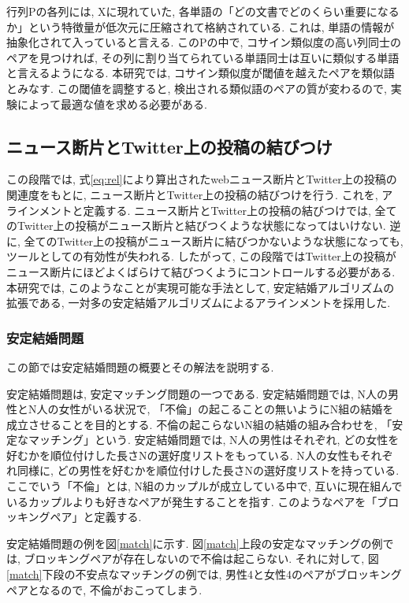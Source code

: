 \documentclass[12pt]{jarticle}
\begin{document}
行列Pの各列には, Xに現れていた, 各単語の「どの文書でどのくらい重要になるか」という特徴量が低次元に圧縮されて格納されている. これは, 単語の情報が抽象化されて入っていると言える. このPの中で, コサイン類似度の高い列同士のペアを見つければ, その列に割り当てられている単語同士は互いに類似する単語と言えるようになる. 本研究では, コサイン類似度が閾値を越えたペアを類似語とみなす. この閾値を調整すると, 検出される類似語のペアの質が変わるので, 実験によって最適な値を求める必要がある. 

\subsection{ニュース断片とTwitter上の投稿の結びつけ}
この段階では, 式\ref{eq:rel}により算出されたwebニュース断片とTwitter上の投稿の関連度をもとに, ニュース断片とTwitter上の投稿の結びつけを行う. これを, アラインメントと定義する. ニュース断片とTwitter上の投稿の結びつけでは, 全てのTwitter上の投稿がニュース断片と結びつくような状態になってはいけない. 逆に, 全てのTwitter上の投稿がニュース断片に結びつかないような状態になっても, ツールとしての有効性が失われる. したがって, この段階ではTwitter上の投稿がニュース断片にほどよくばらけて結びつくようにコントロールする必要がある. 本研究では, このようなことが実現可能な手法として, 安定結婚アルゴリズム\cite{smp}の拡張である, 一対多の安定結婚アルゴリズム\cite{psmp}によるアラインメントを採用した. 

\subsubsection{安定結婚問題}
この節では安定結婚問題の概要とその解法を説明する. 

安定結婚問題\cite{smp}は, 安定マッチング問題の一つである. 
安定結婚問題では, N人の男性とN人の女性がいる状況で, 「不倫」の起こることの無いようにN組の結婚を成立させることを目的とする. 
不倫の起こらないN組の結婚の組み合わせを, 「安定なマッチング」という. 
安定結婚問題では, N人の男性はそれぞれ, どの女性を好むかを順位付けした長さNの選好度リストをもっている. 
N人の女性もそれぞれ同様に, どの男性を好むかを順位付けした長さNの選好度リストを持っている. 
ここでいう「不倫」とは, N組のカップルが成立している中で, 互いに現在組んでいるカップルよりも好きなペアが発生することを指す. 
このようなペアを「ブロッキングペア」と定義する. 

安定結婚問題の例を図\ref{match}に示す. 図\ref{match}上段の安定なマッチングの例では, ブロッキングペアが存在しないので不倫は起こらない. 
それに対して, 図\ref{match}下段の不安点なマッチングの例では, 男性4と女性4のペアがブロッキングペアとなるので, 不倫がおこってしまう. 
\end{document}
